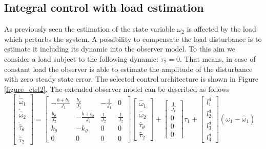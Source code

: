 \documentclass[12pt,a4paper,oneside]{book}
\begin{document}
\begin{onehalfspace}
\subsection{Integral control with load estimation} 
As previously seen the estimation of the state variable $\omega_2$ is affected 
by the load which perturbs the system. A possibility to compensate the load 
disturbance is to estimate it including its dynamic into the observer model. To 
this aim we consider a load subject to the following dynamic: $\dot{\tau}_2=0$. 
That means, in case of constant load the observer is able to estimate the 
amplitude of the disturbance with zero steady state error. The selected control 
architecture is shown in Figure \ref{figure_ctrl2}.
The extended observer model can be described as follows
\begin{equation}\label{two_mass_obs_ext}
	\begin{bmatrix}
		\dot{\hat{\omega}}_1 \\[6pt]
		\dot{\hat{\omega}}_2 \\[6pt]
		\dot{\hat{\tau}}_{\theta} \\[6pt]
		\dot{\hat{\tau}}_2
	\end{bmatrix} = 
	\begin{bmatrix}
		-\frac{b+b_{\theta}}{J_1} & \frac{b_{\theta}}{J_1} & -\frac{1}{J_1} & 0 
		\\[6pt]
		\frac{b_{\theta}}{J_2} & -\frac{b+b_{\theta}}{J_2} & \frac{1}{J_2} & 
		\frac{1}{J_2}\\[6pt]
		k_{\theta} & -k_{\theta} & 0 & 0 \\[6pt]
		0 & 0 & 0 & 0
	\end{bmatrix}
	\begin{bmatrix}
		{\hat{\omega}_1} \\[6pt]
		{\hat{\omega}_2} \\[6pt]
		{\hat{\tau}}_{\theta} \\[6pt]
		{\hat{\tau}}_2
	\end{bmatrix} + 
	\begin{bmatrix}
		\frac{1}{J_1} \\[6pt]
		0 \\[6pt]
		0 \\[6pt]
		0
	\end{bmatrix} \tau_1+ 
	\begin{bmatrix}
		l_1^d\\[6pt]
		l_2^d \\[6pt]
		l_3^d \\[6pt]
		l_4^d
	\end{bmatrix} (\omega_1-\hat{\omega}_1)

\end{equation}
\end{onehalfspace}
\end{document}
